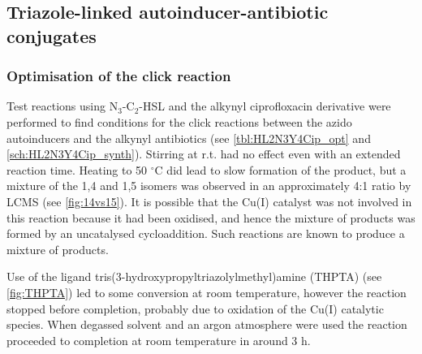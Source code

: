 \subsection{Triazole-linked autoinducer-antibiotic conjugates\label{sec:Tris}}

\subsubsection{Optimisation of the click reaction}

Test reactions using N$_3$-C$_2$-HSL  and the alkynyl ciprofloxacin derivative  were performed to find conditions for the click reactions between the azido autoinducers and the alkynyl antibiotics (see \ref{tbl:HL2N3Y4Cip_opt} and \ref{sch:HL2N3Y4Cip_synth}). 
Stirring at r.t. had no effect even with an extended reaction time. Heating to 50 $^{\circ}$C did lead to slow formation of the product, but a mixture of the 1,4  and 1,5  isomers was observed in an approximately 4:1 ratio by LCMS (see \ref{fig:14vs15}). It is possible that the Cu(I) catalyst was not involved in this reaction because it had been oxidised, and hence the mixture of products was formed by an uncatalysed cycloaddition. Such reactions are known to produce a mixture of products\cite{Rostovtsev2002}.

Use of the ligand tris(3-hydroxypropyltriazolylmethyl)amine (THPTA)  (see \ref{fig:THPTA}) led to some conversion at room temperature, however the reaction stopped before completion, probably due to oxidation of the Cu(I) catalytic species. When degassed solvent and an argon atmosphere were used the reaction proceeded to completion at room temperature in around 3 h.


